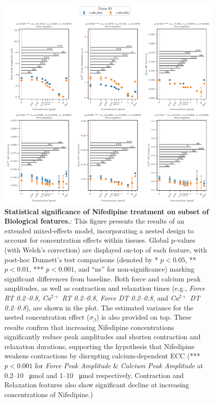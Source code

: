 \documentclass{report}
\begin{document}
            \begin{figure}[H]
                \centering
                \includegraphics[width=1.0\textwidth, keepaspectratio]{plots/chapter_5/nifedipine/significance_features_lmer_subset_6.pdf}
                \caption[Statistical significance of Nifedipine treatment on subset of Biological features.]{\textbf{Statistical significance of Nifedipine treatment on subset of Biological features.}: This figure presents the results of an extended mixed-effects model, incorporating a nested design to account for concentration effects within tissues. Global p-values (with Welch’s correction) are displayed on-top of each feature, with post-hoc Dunnett’s test comparisons (denoted by * \(p < 0.05\), ** \(p < 0.01\), *** \(p < 0.001\), and “ns” for non-significance) marking significant differences from baseline. Both force and calcium peak amplitudes, as well as contraction and relaxation times (e.g., \textit{Force RT 0.2–0.8, Ca\(^{2+}\) RT 0.2–0.8, Force DT 0.2–0.8}, and \textit{Ca\(^{2+}\) DT 0.2–0.8}), are shown in the plot. The estimated variance for the nested concentration effect (\(\sigma_\beta\)) is also provided on top. These results confirm that increasing Nifedipine concentrations significantly reduce peak amplitudes and shorten contraction and relaxation durations, supporting the hypothesis that Nifedipine weakens contractions by disrupting calcium-dependent ECC (*** \(p < 0.001\) for \textit{Force Peak Amplitude} \& \textit{Calcium Peak Amplitude} at 0.2–10 \SI{}{\umol} and 1–10 \SI{}{\umol} respectively. Contraction and Relaxation features also show significant decline at increasing concentrations of Nifedipine.)}
                \label{fig:sig_subset_nifedipine}
            \end{figure}
        
\end{document}
